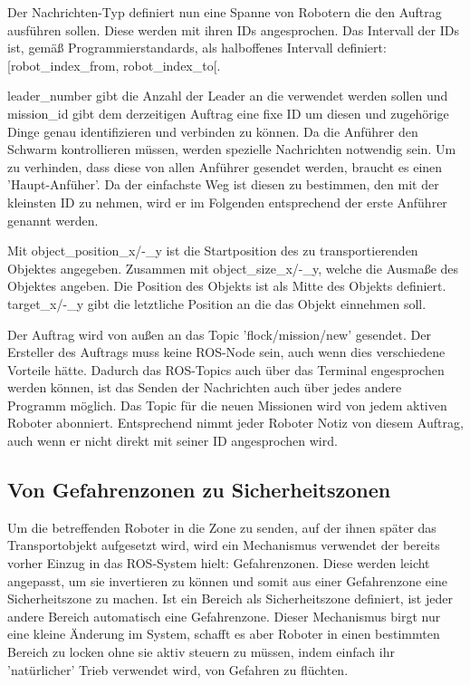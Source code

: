 Der Nachrichten-Typ definiert nun eine Spanne von Robotern die den Auftrag ausführen sollen. Diese werden mit ihren IDs angesprochen. Das Intervall der IDs ist, gemäß Programmierstandards, als halboffenes Intervall definiert: [robot\_index\_from, robot\_index\_to[.

leader\_number gibt die Anzahl der Leader an die verwendet werden sollen und mission\_id gibt dem derzeitigen Auftrag eine fixe ID um diesen und zugehörige Dinge genau identifizieren und verbinden zu können. Da die Anführer den Schwarm kontrollieren müssen, werden spezielle Nachrichten notwendig sein. Um zu verhinden, dass diese von allen Anführer gesendet werden, braucht es einen 'Haupt-Anfüher'. Da der einfachste Weg ist diesen zu bestimmen, den mit der kleinsten ID zu nehmen, wird er im Folgenden entsprechend der erste Anführer genannt werden.

Mit object\_position\_x/-\_y ist die Startposition des zu transportierenden Objektes angegeben. Zusammen mit object\_size\_x/-\_y, welche die Ausmaße des Objektes angeben. Die Position des Objekts ist als Mitte des Objekts definiert.
target\_x/-\_y gibt die letztliche Position an die das Objekt einnehmen soll.

Der Auftrag wird von außen an das Topic 'flock/mission/new' gesendet. Der Ersteller des Auftrags muss keine ROS-Node sein, auch wenn dies verschiedene Vorteile hätte. Dadurch das ROS-Topics auch über das Terminal engesprochen werden können, ist das Senden der Nachrichten auch über jedes andere Programm möglich. Das Topic für die neuen Missionen wird von jedem aktiven Roboter abonniert. Entsprechend nimmt jeder Roboter Notiz von diesem Auftrag, auch wenn er nicht direkt mit seiner ID angesprochen wird.


\subsection*{Von Gefahrenzonen zu Sicherheitszonen}

Um die betreffenden Roboter in die Zone zu senden, auf der ihnen später das Transportobjekt aufgesetzt wird, wird ein Mechanismus verwendet der bereits vorher Einzug in das ROS-System hielt: Gefahrenzonen. Diese werden leicht angepasst, um sie invertieren zu können und somit aus einer Gefahrenzone eine Sicherheitszone zu machen. Ist ein Bereich als Sicherheitszone definiert, ist jeder andere Bereich automatisch eine Gefahrenzone.
Dieser Mechanismus birgt nur eine kleine Änderung im System, schafft es aber Roboter in einen bestimmten Bereich zu locken ohne sie aktiv steuern zu müssen, indem einfach ihr 'natürlicher' Trieb verwendet wird, von Gefahren zu flüchten.

